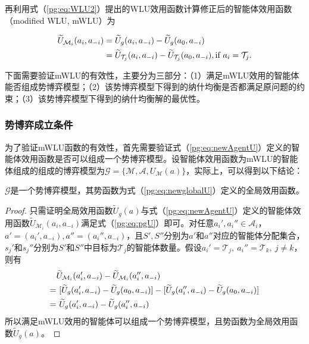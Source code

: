 再利用式（\ref{pg:eq:WLU2}）提出的WLU效用函数计算修正后的智能体效用函数（modified WLU, mWLU）为

\begin{align}
\label{pg:eq:newAgentU}
	\widetilde U_{\mathcal{M}_i}(a_i,a_{-i}) &= \widetilde U_g(a_i,a_{-i}) - \widetilde U_g(a_0,a_{-i})\notag\\
	&= \widetilde U_{\mathcal{T}_j}(a_i,a_{-i}) - \widetilde U_{\mathcal{T}_j}(a_0,a_{-i}),\quad \text{if}\ a_i=\mathcal{T}_j.
\end{align}

下面需要验证mWLU的有效性，主要分为三部分：（1）满足mWLU效用的智能体能否组成势博弈模型；（2）该势博弈模型下得到的纳什均衡是否都满足原问题的约束；（3）该势博弈模型下得到的纳什均衡解的最优性。

\subsubsection{势博弈成立条件}
\label{pg:mWLU:pgcondition}
为了验证mWLU函数的有效性，首先需要验证式（\ref{pg:eq:newAgentU}）定义的智能体效用函数是否可以组成一个势博弈模型。设智能体效用函数为mWLU的智能体组成的组成的博弈模型为$\mathcal{G}=\{\mathcal{M},\mathcal{A},U_{\mathcal{M}}(a)\}$，实际上，可以得到以下结论：

\begin{proposition}[势博弈成立条件]
	$\mathcal{G}$是一个势博弈模型，其势函数为式（\ref{pg:eq:newglobalU}）定义的全局效用函数。
	
	\begin{proof}
		只需证明全局效用函数$\widetilde U_g(a)$与式（\ref{pg:eq:newAgentU}）定义的智能体效用函数$\widetilde U_{\mathcal{M}_i}(a_i,a_{-i})$满足式（\ref{pg:eq:pgU}）即可。对任意$a_i',a_i'' \in \mathcal{A}_i$，$a'=(a_i',a_{-i}),a''=(a_i'',a_{-i})$，且$S',S''$分别为$a'$和$a''$对应的智能体分配集合，$s_j'$和$s_j''$分别为$S'$和$S''$中目标为$\mathcal{T}_j$的智能体数量。假设$a_i'=\mathcal{T}_j,\ a_i''=\mathcal{T}_k,\ j\neq k$，则有
		\begin{align}
			&\widetilde U_{\mathcal{M}_i}(a_i',a_{-i}) - \widetilde U_{\mathcal{M}_i}(a_i'',a_{-i})\notag\\
			= &\ [\widetilde U_g(a_i',a_{-i}) - \widetilde U_g(a_0,a_{-i})] - [\widetilde U_g(a_i'',a_{-i}) - \widetilde U_g(a_0,a_{-i})]\notag\\
			\label{pg:pf:eq:pg} = &\ \widetilde U_g(a_i',a_{-i}) - \widetilde U_g(a_i'',a_{-i})
		\end{align}
		所以满足mWLU效用的智能体可以组成一个势博弈模型，且势函数为全局效用函数$\widetilde U_g(a)$。
	\end{proof}
\end{proposition}


